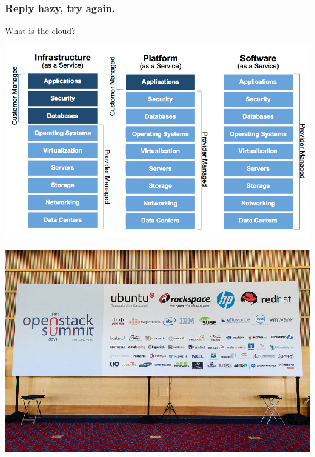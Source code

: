 \begin{frame}
\frametitle{Reply hazy, try again.}

What is the cloud?





\end{frame}

\begin{frame}
\begin{center}
     \includegraphics[width=\textwidth]{images/aas.png}
\end{center}
\end{frame}


\begin{frame}
\begin{center}
     \includegraphics[width=\textwidth]{images/osdevdays.jpg}
\end{center}
\end{frame}




